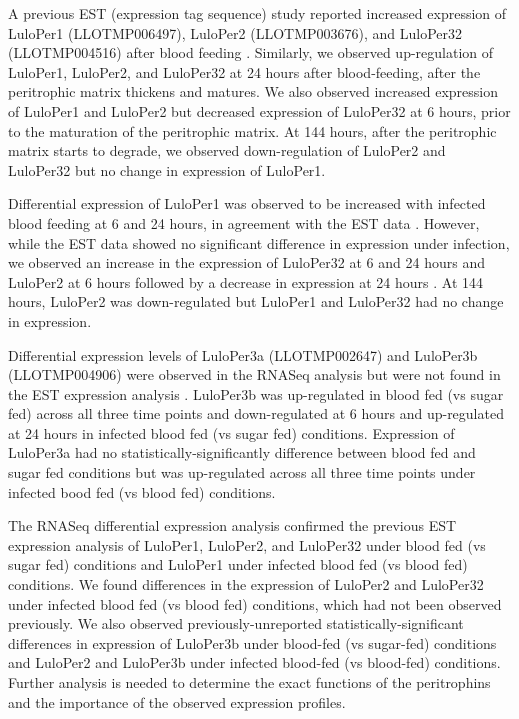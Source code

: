 A previous EST (expression tag sequence) study reported increased expression of LuloPer1 (LLOTMP006497), LuloPer2 (LLOTMP003676), and LuloPer32 (LLOTMP004516) after blood feeding \cite{Jochim2008}. Similarly, we observed up-regulation of LuloPer1, LuloPer2, and LuloPer32 at 24 hours after blood-feeding, after the peritrophic matrix thickens and matures.  We also observed increased expression of LuloPer1 and LuloPer2 but decreased expression of LuloPer32 at 6 hours, prior to the maturation of the peritrophic matrix. At 144 hours, after the peritrophic matrix starts to degrade, we observed down-regulation of LuloPer2 and LuloPer32 but no change in expression of LuloPer1.

Differential expression of LuloPer1 was observed to be increased with infected blood feeding at 6 and 24 hours, in agreement with the EST data \cite{Jochim2008,Dostalova2012}.  However, while the EST data showed no significant difference in expression under infection, we observed an increase in the expression of LuloPer32 at 6 and 24 hours and LuloPer2 at 6 hours followed by a decrease in expression at 24 hours \cite{Jochim2008}.  At 144 hours, LuloPer2 was down-regulated but LuloPer1 and LuloPer32 had no change in expression.

Differential expression levels of LuloPer3a (LLOTMP002647) and LuloPer3b (LLOTMP004906) were observed in the RNASeq analysis but were not found in the EST expression analysis \cite{Jochim2008}. LuloPer3b was up-regulated in blood fed (vs sugar fed) across all three time points and down-regulated at 6 hours and up-regulated at 24 hours in infected blood fed (vs sugar fed) conditions.  Expression of LuloPer3a had no statistically-significantly difference between blood fed and sugar fed conditions but was up-regulated across all three time points under infected bood fed (vs blood fed) conditions.

The RNASeq differential expression analysis confirmed the previous EST expression analysis of LuloPer1, LuloPer2, and LuloPer32 under blood fed (vs sugar fed) conditions and LuloPer1 under infected blood fed (vs blood fed) conditions.  We found differences in the expression of LuloPer2 and LuloPer32 under infected blood fed (vs blood fed) conditions, which had not been observed previously.  We also observed previously-unreported statistically-significant differences in expression of LuloPer3b under blood-fed (vs sugar-fed) conditions and LuloPer2 and LuloPer3b under infected blood-fed (vs blood-fed) conditions. Further analysis is needed to determine the exact functions of the peritrophins and the importance of the observed expression profiles.

